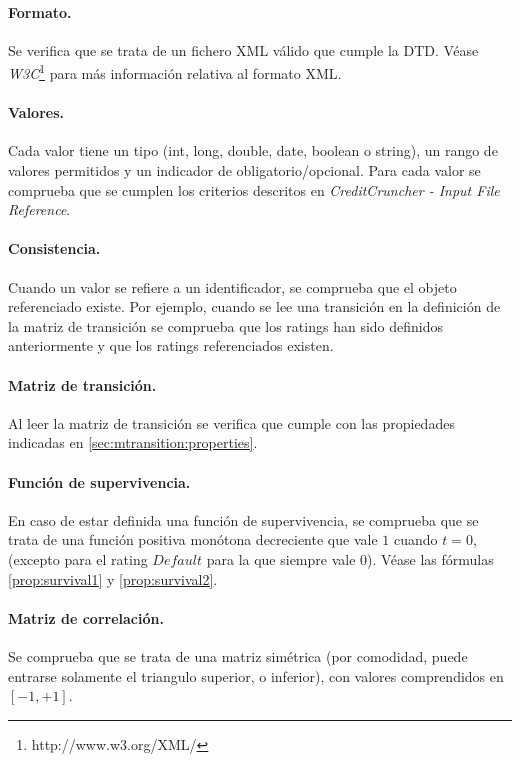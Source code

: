\paragraph{Formato.} Se verifica que se trata de un fichero XML
v\'alido que cumple la DTD. V\'ease \emph{W3C}\footnote{http://www.w3.org/XML/}
para m\'as informaci\'on relativa al formato XML.

\paragraph{Valores.} Cada valor tiene un tipo (int, long, double,
date, boolean o string), un rango de valores permitidos y un
indicador de obligatorio/opcional. Para cada valor se comprueba
que se cumplen los criterios descritos en
\emph{CreditCruncher - Input File Reference}.

\paragraph{Consistencia.} Cuando un valor se refiere a un identificador,
se comprueba que el objeto referenciado existe. Por ejemplo, cuando se
lee una transici\'on en la definici\'on de la matriz de transici\'on se
comprueba que los ratings han sido definidos anteriormente y que los
ratings referenciados existen.

\paragraph{Matriz de transici\'on.} Al leer la matriz de transici\'on
se verifica que cumple con las propiedades indicadas en
\ref{sec:mtransition:properties}.

\paragraph{Funci\'on de supervivencia.} En caso de estar definida
una funci\'on de supervivencia, se comprueba que se trata de una
funci\'on positiva mon\'otona decreciente que vale $1$ cuando $t=0$,
(excepto para el rating $Default$ para la que siempre vale $0$).
V\'ease las f\'ormulas \ref{prop:survival1} y \ref{prop:survival2}.

\paragraph{Matriz de correlaci\'on.} Se comprueba que se trata de
una matriz sim\'etrica (por comodidad, puede entrarse solamente
el triangulo superior, o inferior), con valores comprendidos
en $[-1,+1]$.

